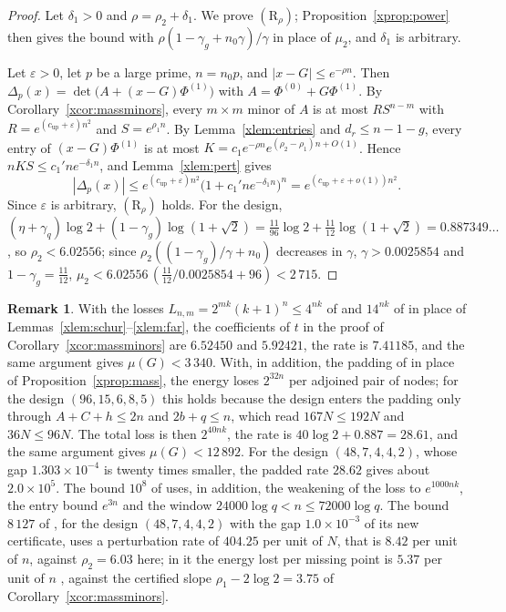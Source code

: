 \documentclass[11pt]{article}
\theoremstyle{definition}
\newtheorem{remark}[theorem]{Remark}
\begin{document}
\begin{proof}
Let $\delta_1>0$ and $\rho=\rho_2+\delta_1$. We prove $(\mathrm R_\rho)$; Proposition~\ref{xprop:power} then gives the bound with $\rho(1-\gamma_g+n_0\gamma)/\gamma$ in place of $\mu_2$, and $\delta_1$ is arbitrary.

Let $\varepsilon>0$, let $p$ be a large prime, $n=n_0p$, and $|x-G|\le e^{-\rho n}$. Then $\Delta_p(x)=\det\big(A+(x-G)\Phi^{(1)}\big)$ with $A=\Phi^{(0)}+G\Phi^{(1)}$. By Corollary~\ref{xcor:massminors}, every $m\times m$ minor of $A$ is at most $RS^{n-m}$ with $R=e^{(c_{\mathrm{up}}+\varepsilon)n^2}$ and $S=e^{\rho_1n}$. By Lemma~\ref{xlem:entries} and $d_r\le n-1-g$, every entry of $(x-G)\Phi^{(1)}$ is at most $K=c_1e^{-\rho n}e^{(\rho_2-\rho_1)n+O(1)}$. Hence $nKS\le c_1'ne^{-\delta_1n}$, and Lemma~\ref{xlem:pert} gives
\[
|\Delta_p(x)|\le e^{(c_{\mathrm{up}}+\varepsilon)n^2}\big(1+c_1'ne^{-\delta_1n}\big)^n=e^{(c_{\mathrm{up}}+\varepsilon+o(1))n^2}.
\]
Since $\varepsilon$ is arbitrary, $(\mathrm R_\rho)$ holds. For the design, $(\eta+\gamma_q)\log2+(1-\gamma_g)\log(1+\sqrt2)=\frac{11}{96}\log2+\frac{11}{12}\log(1+\sqrt2)=0.887349\ldots$, so $\rho_2<6.02556$; since $\rho_2((1-\gamma_g)/\gamma+n_0)$ decreases in $\gamma$, $\gamma>0.0025854$ and $1-\gamma_g=\frac{11}{12}$, $\mu_2<6.02556\,(\tfrac{11}{12}/0.0025854+96)<2\,715$.
\end{proof}

\begin{remark}
With the losses $L_{n,m}=2^{mk}(k+1)^n\le4^{nk}$ of \cite[Lemma~4.1, Corollary~4.2]{Jha} and $14^{nk}$ of \cite[Lemma~4.5]{Jha} in place of Lemmas~\ref{xlem:schur}--\ref{xlem:far}, the coefficients of $t$ in the proof of Corollary~\ref{xcor:massminors} are $6.52450$ and $5.92421$, the rate is $7.41185$, and the same argument gives $\mu(G)<3\,340$. With, in addition, the padding of \cite[Proposition~5.4]{Jha} in place of Proposition~\ref{xprop:mass}, the energy loses $2^{32n}$ per adjoined pair of nodes; for the design $(96,15,6,8,5)$ this holds because the design enters the padding only through $A+C+h\le2n$ and $2b+q\le n$, which read $167N\le192N$ and $36N\le96N$. The total loss is then $2^{40nk}$, the rate is $40\log2+0.887=28.61$, and the same argument gives $\mu(G)<12\,892$. For the design $(48,7,4,4,2)$, whose gap $1.303\times10^{-4}$ is twenty times smaller, the padded rate $28.62$ gives about $2.0\times10^5$. The bound $10^8$ of \cite{Jha} uses, in addition, the weakening of the loss to $e^{1000nk}$, the entry bound $e^{3n}$ and the window $24000\log q<n\le72000\log q$. The bound $8\,127$ of \cite{Litsey}, for the design $(48,7,4,4,2)$ with the gap $1.0\times10^{-3}$ of its new certificate, uses a perturbation rate of $404.25$ per unit of $N$, that is $8.42$ per unit of $n$, against $\rho_2=6.03$ here; in it the energy lost per missing point is $5.37$ per unit of $n$ \cite[Proposition~5.10]{Litsey}, against the certified slope $\rho_1-2\log2=3.75$ of Corollary~\ref{xcor:massminors}.
\end{remark}
\end{document}
